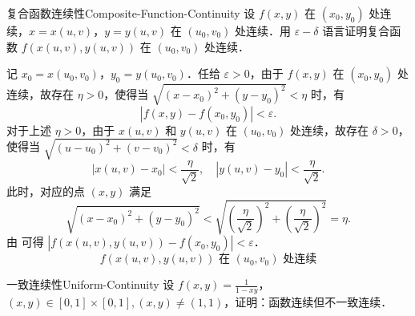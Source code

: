\begin{problem}{复合函数连续性}{Composite-Function-Continuity}
    设 $f(x,y)$ 在 $(x_0, y_0)$ 处连续，$x = x(u,v)$，$y = y(u,v)$ 在 $(u_0, v_0)$ 处连续．用 $\varepsilon - \delta$ 语言证明复合函数 $f(x(u,v), y(u,v))$ 在 $(u_0, v_0)$ 处连续．
\end{problem}

\begin{myproof}
    记 $x_0 = x(u_0, v_0)$，$y_0 = y(u_0, v_0)$．任给 $\varepsilon > 0$，由于 $f(x,y)$ 在 $(x_0, y_0)$ 处连续，故存在 $\eta > 0$，使得当 $\sqrt{(x-x_0)^2 + (y-y_0)^2} < \eta$ 时，有
    \begin{equation}
        |f(x,y) - f(x_0, y_0)| < \varepsilon.
        \label{eq:f-continuity}
    \end{equation}
    对于上述 $\eta > 0$，由于 $x(u,v)$ 和 $y(u,v)$ 在 $(u_0, v_0)$ 处连续，故存在 $\delta > 0$，使得当 $\sqrt{(u-u_0)^2 + (v-v_0)^2} < \delta$ 时，有
    \begin{equation}
        |x(u,v) - x_0| < \frac{\eta}{\sqrt{2}}, \quad |y(u,v) - y_0| < \frac{\eta}{\sqrt{2}}.
        \label{eq:xy-continuity}
    \end{equation}
    此时，对应的点 $(x,y)$ 满足
    \begin{equation}
        \sqrt{(x-x_0)^2 + (y-y_0)^2} < \sqrt{\left( \frac{\eta}{\sqrt{2}} \right)^2 + \left( \frac{\eta}{\sqrt{2}} \right)^2} = \eta.
    \end{equation}
    由  可得 $|f(x(u,v), y(u,v)) - f(x_0, y_0)| < \varepsilon$．
    \begin{equation}
        \boxed{f(x(u,v), y(u,v)) \text{ 在 } (u_0, v_0) \text{ 处连续}}
    \end{equation}
\end{myproof}

\begin{problem}{一致连续性}{Uniform-Continuity}
    设 $f(x,y) = \frac{1}{1-xy}$，$(x,y) \in [0,1] \times [0,1], (x,y) \neq (1,1)$，证明：函数连续但不一致连续．
\end{problem}

